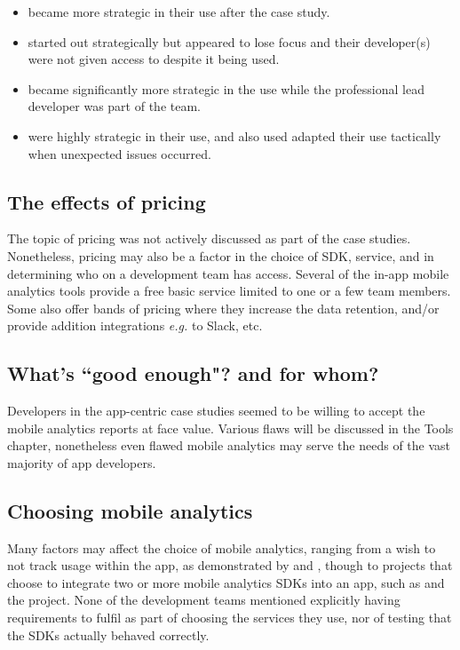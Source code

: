 \begin{itemize}
    \item {} became more strategic in their use after the case study.
    \item {} started out strategically but appeared to lose focus and their developer(s) were not given access to  despite it being used.
    \item {} became significantly more strategic in the use  while the professional lead developer was part of the team.
    \item {} were highly strategic in their use, and also used adapted their use tactically when unexpected issues occurred.
\end{itemize}

\subsection{The effects of pricing}
The topic of pricing was not actively discussed as part of the case studies. Nonetheless, pricing may also be a factor in the choice of SDK, service, and in determining who on a development team has access. Several of the in-app mobile analytics tools provide a free basic service limited to one or a few team members.  Some also offer bands of pricing where they increase the data retention, and/or provide addition integrations \emph{e.g.} to Slack, etc. 

\subsection{What's ``good enough"? and for whom?}
Developers in the app-centric case studies seemed to be willing to accept the mobile analytics reports at face value. Various flaws will be discussed in the Tools chapter, nonetheless even flawed mobile analytics may serve the needs of the vast majority of app developers. 

\subsection{Choosing mobile analytics}
Many factors may affect the choice of mobile analytics, ranging from a wish to not track usage within the app, as demonstrated by  and , though to projects that choose to integrate two or more mobile analytics SDKs into an app, such as  and the  project. None of the development teams mentioned explicitly having requirements to fulfil as part of choosing the services they use, nor of testing that the SDKs actually behaved correctly.  

